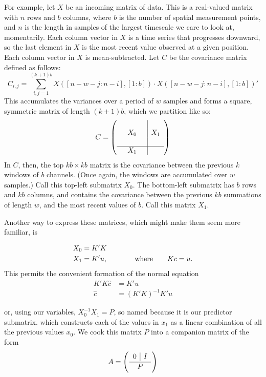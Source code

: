 \documentclass[a4paper,10pt]{report}
\numberwithin{equation}{section}
\begin{document}
For example, let $X$ be an incoming matrix of data. This is a real-valued matrix with $n$ rows and $b$ columns, where $b$ is the number of spatial measurement points, and $n$ is the length in samples of the largest timescale we care to look at, momentarily. Each column vector in $X$ is a time series that progresses downward, so the last element in $X$ is the most recent value observed at a given position. Each column vector in $X$ is mean-subtracted. Let $C$ be the covariance matrix defined as follows:
\begin{equation}\label{covariance_w}
C_{i,j} = \sum_{i,j = 1}^{(k+1)b} X([n - w - j : n - i], [1:b]) \cdot X([n - w - j : n - i], [1:b])'
\end{equation}
This accumulates the variances over a period of $w$ samples and forms a square, symmetric matrix of length $(k+1)b$, which we partition like so:
\begin{equation}\label{covariance_part}
C = \left(
\begin{array}{c c c | c}
 {} & {} & {} &{} \\
 {} & X_0 & {} & X_1 \\
 {} & {} &  {} & {} \\
 \hline
 {} & X_1 & {} & {}
\end{array}
\right)
\end{equation}
In $C$, then, the top $kb \times kb$ matrix is the covariance between the previous $k$ windows of $b$ channels. (Once again, the windows are accumulated over $w$ samples.) Call this top-left submatrix $X_0$. The bottom-left submatrix has $b$ rows and $kb$ columns, and contains the covariance between the previous $kb$ summations of length $w$, and the most recent values of $b$. Call this matrix $X_1$.

Another way to express these matrices, which might make them seem more familiar, is
\begin{singlespace}
\begin{align}
X_0 &= K'K\notag\\
X_1 &= K'u \text{,} \qquad \qquad \text{where} \qquad
Kc = u \text{.} \notag\\
\end{align}
This permits the convenient formation of the normal equation
\begin{align*}
K'K\hat{c} &= K'u\\
\hat{c} &= (K'K)^{-1} K'u
\end{align*}
\end{singlespace}
or, using our variables, $X_0^{-1} X_1 = P$, so named because it is our predictor submatrix. which constructs each of the values in $x_1$ as a linear combination of all the previous values $x_0$. We cook this matrix $P$ into a companion matrix of the form
\begin{equation}\label{companion_part}
A = \left(
\frac{
\begin{array}{ c | c }
 0 &I 
\end{array}
}{P}\right)
\end{equation}
\end{document}
